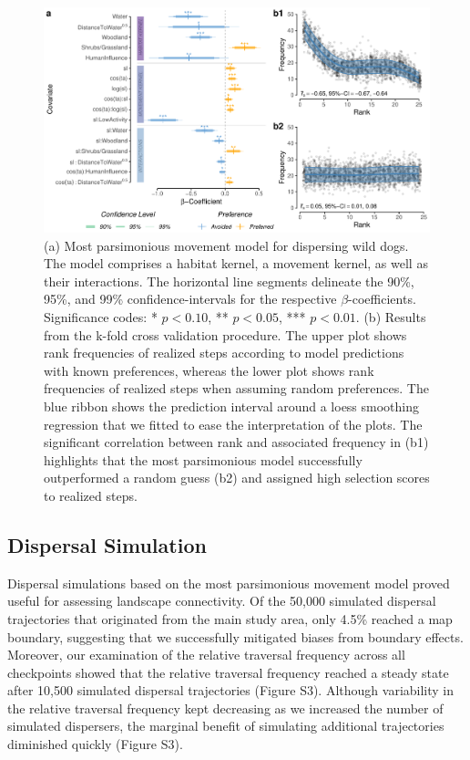 \documentclass[abstract=on,10pt,a4paper,bibliography=totocnumbered]{article}
\begin{document}
\begin{figure}
  \begin{center}
    \includegraphics[width=\textwidth]{99_MovementModel}
    \caption{(a) Most parsimonious movement model for dispersing wild dogs. The
    model comprises a habitat kernel, a movement kernel, as well as their
    interactions. The horizontal line segments delineate the 90\%, 95\%, and
    99\% confidence-intervals for the respective \(\beta\)-coefficients.
    Significance codes: * \(p < 0.10\), ** \(p < 0.05\), *** \(p < 0.01\). (b)
    Results from the k-fold cross validation procedure. The upper plot shows
    rank frequencies of realized steps according to model predictions with known
    preferences, whereas the lower plot shows rank frequencies of realized steps
    when assuming random preferences. The blue ribbon shows the prediction
    interval around a loess smoothing regression that we fitted to ease the
    interpretation of the plots. The significant correlation between rank and
    associated frequency in (b1) highlights that the most parsimonious model
    successfully outperformed a random guess (b2) and assigned high selection
    scores to realized steps.}
    \label{MovementModel}
  \end{center}
\end{figure}

\subsection{Dispersal Simulation}
Dispersal simulations based on the most parsimonious movement model proved
useful for assessing landscape connectivity. Of the 50,000 simulated dispersal
trajectories that originated from the main study area, only 4.5\% reached a map
boundary, suggesting that we successfully mitigated biases from boundary
effects. Moreover, our examination of the relative traversal frequency across
all checkpoints showed that the relative traversal frequency reached a steady
state after 10,500 simulated dispersal trajectories (Figure S3). Although
variability in the relative traversal frequency kept decreasing as we increased
the number of simulated dispersers, the marginal benefit of simulating
additional trajectories diminished quickly (Figure S3).
\end{document}
